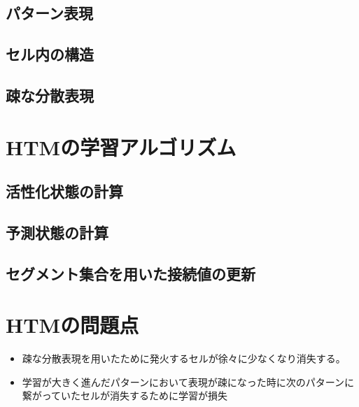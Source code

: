 \subsection{パターン表現}
\subsection{セル内の構造}
\subsection{疎な分散表現}


\section{HTMの学習アルゴリズム}
\subsection{活性化状態の計算}
\subsection{予測状態の計算}
\subsection{セグメント集合を用いた接続値の更新}


\section{HTMの問題点}
\begin{itemize}
  \item 疎な分散表現を用いたために発火するセルが徐々に少なくなり消失する。
  \item 学習が大きく進んだパターンにおいて表現が疎になった時に次のパターンに繋がっていたセルが消失するために学習が損失
\end{itemize}
